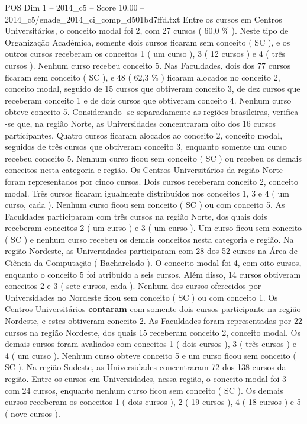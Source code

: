 \begin{textsample}{POS Dim 1 – 2014\_c5 – Score 10.00 – 2014\_c5/enade\_2014\_ci\_comp\_d501bd7ffd.txt}
Entre os cursos em Centros Universitários, o conceito modal foi 2, com 27 cursos ( 60,0 \% ).
Neste tipo de Organização Acadêmica, somente dois cursos ficaram sem conceito ( SC ), e os outros cursos receberam os conceitos 1 ( um curso ), 3 ( 12 cursos ) e 4 ( três cursos ).
Nenhum curso recebeu conceito 5.
Nas Faculdades, dois dos 77 cursos ficaram sem conceito ( SC ), e 48 ( 62,3 \% ) ficaram alocados no conceito 2, conceito modal, seguido de 15 cursos que obtiveram conceito 3, de dez cursos que receberam conceito 1 e de dois cursos que obtiveram conceito 4.
Nenhum curso obteve conceito 5.
Considerando -se separadamente as regiões brasileiras, verifica -se que, na região Norte, as Universidades concentraram oito dos 16 cursos participantes.
Quatro cursos ficaram alocados ao conceito 2, conceito modal, seguidos de três cursos que obtiveram conceito 3, enquanto somente um curso recebeu conceito 5.
Nenhum curso ficou sem conceito ( SC ) ou recebeu os demais conceitos nesta categoria e região.
Os Centros Universitários da região Norte foram representados por cinco cursos.
Dois cursos receberam conceito 2, conceito modal.
Três cursos ficaram igualmente distribuídos nos conceitos 1, 3 e 4 ( um curso, cada ).
Nenhum curso ficou sem conceito ( SC ) ou com conceito 5.
As Faculdades participaram com três cursos na região Norte, dos quais dois receberam conceitos 2 ( um curso ) e 3 ( um curso ).
Um curso ficou sem conceito ( SC ) e nenhum curso recebeu os demais conceitos nesta categoria e região.
Na região Nordeste, as Universidades participaram com 28 dos 52 cursos na Área de Ciência da Computação ( Bacharelado ).
O conceito modal foi 4, com oito cursos, enquanto o conceito 5 foi atribuído a seis cursos.
Além disso, 14 cursos obtiveram conceitos 2 e 3 ( sete cursos, cada ).
Nenhum dos cursos oferecidos por Universidades no Nordeste ficou sem conceito ( SC ) ou com conceito 1.
Os Centros Universitários \textbf{contaram} com somente dois cursos participante na região Nordeste, e estes obtiveram conceito 2.
As Faculdades foram representadas por 22 cursos na região Nordeste, dos quais 15 receberam conceito 2, conceito modal.
Os demais cursos foram avaliados com conceitos 1 ( dois cursos ), 3 ( três cursos ) e 4 ( um curso ).
Nenhum curso obteve conceito 5 e um curso ficou sem conceito ( SC ).
Na região Sudeste, as Universidades concentraram 72 dos 138 cursos da região.
Entre os cursos em Universidades, nessa região, o conceito modal foi 3 com 24 cursos, enquanto nenhum curso ficou sem conceito ( SC ).
Os demais cursos receberam os conceitos 1 ( dois cursos ), 2 ( 19 cursos ), 4 ( 18 cursos ) e 5 ( nove cursos ).

\end{textsample}

